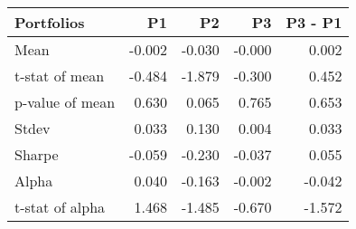 \begin{tabular}{lrrrr}
\toprule
Portfolios & P1 & P2 & P3 & P3 - P1 \\
\midrule
Mean & -0.002 & -0.030 & -0.000 & 0.002 \\
t-stat of mean & -0.484 & -1.879 & -0.300 & 0.452 \\
p-value of mean & 0.630 & 0.065 & 0.765 & 0.653 \\
Stdev & 0.033 & 0.130 & 0.004 & 0.033 \\
Sharpe & -0.059 & -0.230 & -0.037 & 0.055 \\
Alpha & 0.040 & -0.163 & -0.002 & -0.042 \\
t-stat of alpha & 1.468 & -1.485 & -0.670 & -1.572 \\
\bottomrule
\end{tabular}
